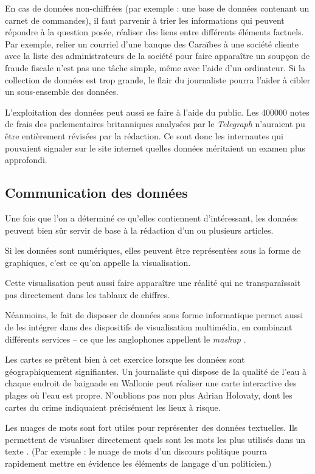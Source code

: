 En cas de données non-chiffrées (par exemple : une base de données contenant un carnet
de commandes), il faut parvenir à trier les informations qui peuvent répondre à la 
question posée, réaliser des liens entre différents éléments factuels.
Par exemple, relier un courriel d'une banque des Caraïbes à une société cliente avec 
la liste des administrateurs de la société pour faire apparaître un soupçon de fraude 
fiscale n'est pas une tâche simple, même avec l'aide d'un ordinateur.
Si la collection de données est trop grande, le flair du journaliste pourra l'aider
à cibler un sous-ensemble des données.


L'exploitation des données peut aussi se faire à l'aide du public. Les 400000 notes 
de frais des 
parlementaires britanniques analysées par le \textit{Telegraph} n'auraient pu être
entièrement révisées par la rédaction. Ce sont donc les internautes qui pouvaient
signaler sur le site internet quelles données méritaient un examen plus approfondi. 


\subsection{Communication des données}

Une fois que l'on a déterminé ce qu'elles contiennent d'intéressant, les données peuvent bien sûr servir de base à la rédaction d'un ou plusieurs articles.

Si les données sont numériques, elles peuvent être représentées sous la forme de 
graphiques, c'est ce qu'on appelle la visualisation.

Cette visualisation peut aussi faire apparaître une réalité qui ne transparaîssait 
pas directement dans les tablaux de chiffres. 

Néanmoins, le fait de disposer de données sous forme informatique permet aussi de 
les intégrer dans des dispositifs de visualisation multimédia, en combinant différents services -- ce que les anglophones appellent le \textit{mashup} \cite{bradshaw}.

Les cartes se prêtent bien à cet exercice lorsque les données sont géographiquement signifiantes. Un journaliste qui dispose de la qualité
de l'eau à chaque endroit de baignade en Wallonie peut réaliser une carte interactive
des plages où l'eau est propre. N'oublions pas non plus Adrian Holovaty, dont les \og 
cartes du crime \fg indiquaient précisément les lieux à risque.

Les nuages de mots sont fort utiles pour représenter des données textuelles. Ils 
permettent de visualiser directement quels sont les mots les plus utilisés dans un texte \cite{bradshaw}. (Par exemple : le nuage de mots d'un discours politique pourra rapidement mettre en évidence les éléments de langage d'un politicien.)

